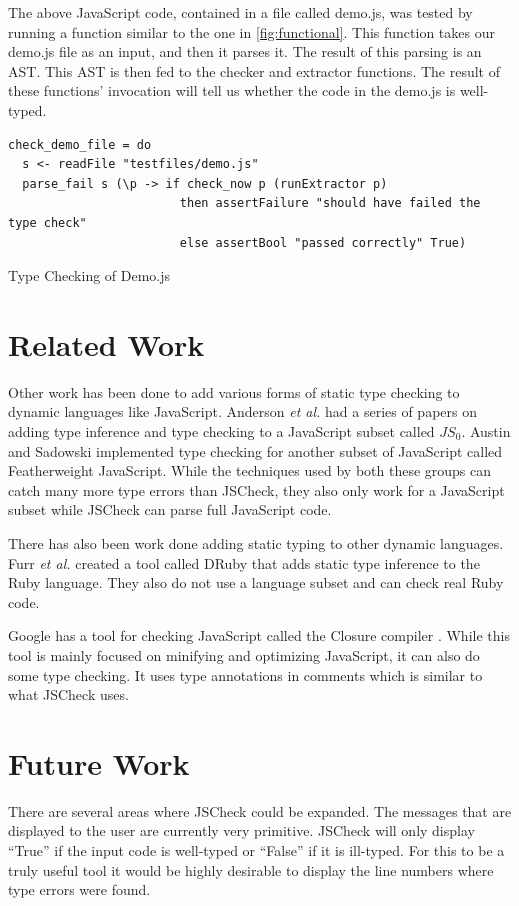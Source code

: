 \documentclass{article}
\begin{document}
The above JavaScript code, contained in a file called demo.js, was tested by running
a function similar to the one in \ref{fig:functional}. This function takes our demo.js 
file as an input, and then it parses it. The result of this parsing is an AST. This AST 
is then fed to the checker and extractor functions. The result of these functions' invocation 
will tell us whether the code in the demo.js is well-typed.


\begin{program}
\begin{verbatim}    
check_demo_file = do
  s <- readFile "testfiles/demo.js"
  parse_fail s (\p -> if check_now p (runExtractor p)
                        then assertFailure "should have failed the type check" 
                        else assertBool "passed correctly" True)
\end{verbatim}
\caption{Type Checking of Demo.js}
\label{fig:functional}
\end{program}
\pagebreak


\section{Related Work}
\label{sec:related}
Other work has been done to add various forms of static type checking to dynamic
languages like JavaScript. Anderson {\em et al.}
\cite{typeinferenceforjavascriptEcoop, typecheckingforjavascript} had a series of papers
on adding type inference and type checking to a JavaScript subset called $JS_0$. Austin
and Sadowski \cite{fwjsStruct} implemented type checking for another subset of JavaScript called 
Featherweight JavaScript. While the techniques used by both these groups can catch 
many more type errors than JSCheck, 
they also only work for a JavaScript subset while JSCheck can parse full JavaScript code.

There has also been work done adding static typing to other dynamic languages. Furr {\em et al.}
\cite{typecheckingruby} created a tool called DRuby that adds static type inference to
the Ruby language. They also do not use a language subset and can check real Ruby code.

Google has a tool for checking JavaScript called the Closure 
compiler \cite{closureCompiler}. While this tool is mainly focused on minifying
and optimizing JavaScript, it can also do some type checking. It uses type
annotations in comments which is similar to what JSCheck uses.

\section{Future Work}
\label{sec:future}
There are several areas where JSCheck could be expanded. The messages that are displayed
to the user are currently very primitive. JSCheck will only display ``True'' if the
input code is well-typed or ``False'' if it is ill-typed. For this to be a truly useful tool
it would be highly desirable to display the line numbers where type errors were found.
\end{document}
